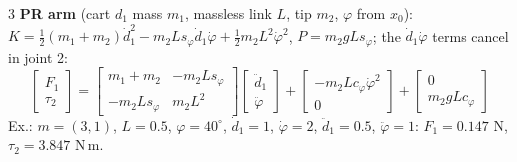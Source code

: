 \begin{multicols}{3}
\textbf{PR arm} (cart $d_1$ mass $m_1$, massless link $L$, tip $m_2$, $\varphi$ from $x_0$): $K=\tfrac12(m_1{+}m_2)\dot d_1^2-m_2Ls_\varphi\dot d_1\dot\varphi+\tfrac12m_2L^2\dot\varphi^2$, $P=m_2gLs_\varphi$; the $\dot d_1\dot\varphi$ terms cancel in joint 2:
\[\begin{bmatrix}F_1\\\tau_2\end{bmatrix}=\begin{bmatrix}m_1{+}m_2&-m_2Ls_\varphi\\-m_2Ls_\varphi&m_2L^2\end{bmatrix}\begin{bmatrix}\ddot d_1\\\ddot\varphi\end{bmatrix}+\begin{bmatrix}-m_2Lc_\varphi\dot\varphi^2\\0\end{bmatrix}+\begin{bmatrix}0\\m_2gLc_\varphi\end{bmatrix}\]
Ex.: $m=(3,1)$, $L=0.5$, $\varphi=40^\circ$, $\dot d_1=1$, $\dot\varphi=2$, $\ddot d_1=0.5$, $\ddot\varphi=1$: $F_1=0.147$ N, $\tau_2=3.847$ N\,m. \chk


\end{multicols}
